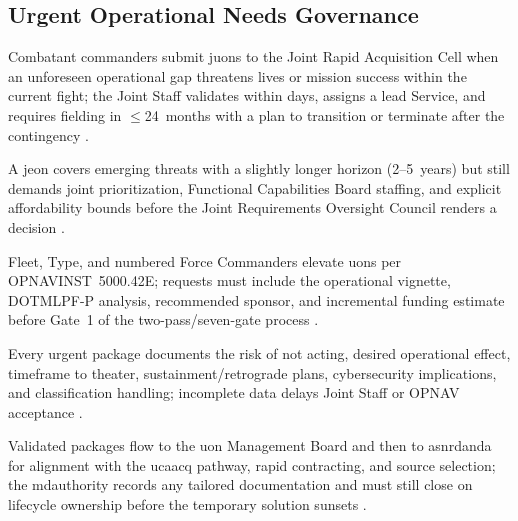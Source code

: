 \documentclass[../main.tex]{subfiles}
\begin{document}
\subsection{Urgent Operational Needs Governance}
\begin{description}[style=nextline,labelsep=0.5em,font=\bfseries]
  \item[\ac{juon}.] Combatant commanders submit \acp{juon} to the Joint Rapid Acquisition Cell when an unforeseen operational gap threatens lives or mission success within the current fight; the Joint Staff validates within days, assigns a lead Service, and requires fielding in $\leq$24~months with a plan to transition or terminate after the contingency \autocite{CJCSI3470-01H}.
  \item[\ac{jeon}.] A \ac{jeon} covers emerging threats with a slightly longer horizon (2--5~years) but still demands joint prioritization, Functional Capabilities Board staffing, and explicit affordability bounds before the Joint Requirements Oversight Council renders a decision \autocite{CJCSI5123-01H}.
  \item[\ac{uon}.] Fleet, Type, and numbered Force Commanders elevate \acp{uon} per OPNAVINST~5000.42E; requests must include the operational vignette, DOTMLPF-P analysis, recommended sponsor, and incremental funding estimate before Gate~1 of the two-pass/seven-gate process \autocite{OPNAVINST5000-42E}.
\end{description}
\begin{description}[style=nextline,labelsep=0.5em,font=\bfseries]
  \item[\textbf{Request content.}] Every urgent package documents the risk of not acting, desired operational effect, timeframe to theater, sustainment/retrograde plans, cybersecurity implications, and classification handling; incomplete data delays Joint Staff or OPNAV acceptance \autocite{CJCSI3470-01H,OPNAVINST5000-42E}.
  \item[\textbf{Acquisition handoff.}] Validated packages flow to the \ac{uon} Management Board and then to \ac{asnrdanda} for alignment with the \ac{ucaacq} pathway, rapid contracting, and source selection; the \ac{mdauthority} records any tailored documentation and must still close on lifecycle ownership before the temporary solution sunsets \autocite{DoDI5000-81}.
\end{description}
\end{document}

